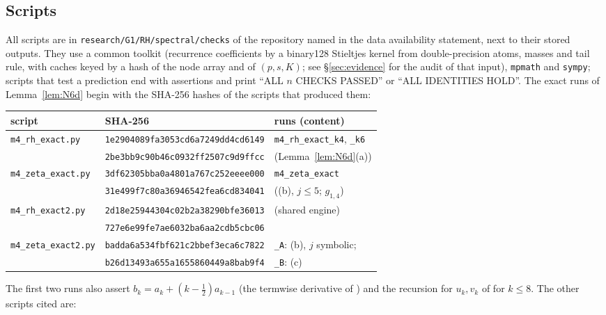 \subsection*{Scripts}
All scripts are in \texttt{research/G1/RH/spectral/checks} of the repository named in the data availability statement, next to their stored
outputs. They use a common toolkit (recurrence coefficients by a binary128 Stieltjes kernel from double-precision atoms, masses and tail
rule, with caches keyed by a hash of the node array and of $(p,s,K)$; see \S\ref{sec:evidence} for the audit of that input), \texttt{mpmath} and \texttt{sympy}; scripts that test a prediction end with assertions and print ``ALL $n$ CHECKS PASSED'' or ``ALL
IDENTITIES HOLD''. The exact runs of Lemma~\ref{lem:N6d} begin with the SHA-256 hashes of the scripts that produced them:
\begin{center}
\small
\begin{tabular}{lll}
\toprule
script & SHA-256 & runs (content)\\
\midrule
\texttt{m4\_rh\_exact.py} & \texttt{1e2904089fa3053cd6a7249dd4cd6149} & \texttt{m4\_rh\_exact\_k4}, \texttt{\_k6}\\
 & \texttt{2be3bb9c90b46c0932ff2507c9d9ffcc} & (Lemma~\ref{lem:N6d}(a))\\
\texttt{m4\_zeta\_exact.py} & \texttt{3df62305bba0a4801a767c252eeee000} & \texttt{m4\_zeta\_exact}\\
 & \texttt{31e499f7c80a36946542fea6cd834041} & ((b), $j\le5$; $g_{1,4}$)\\
\texttt{m4\_rh\_exact2.py} & \texttt{2d18e25944304c02b2a38290bfe36013} & (shared engine)\\
 & \texttt{727e6e99fe7ae6032ba6aa2cdb5cbc06} & \\
\texttt{m4\_zeta\_exact2.py} & \texttt{badda6a534fbf621c2bbef3eca6c7822} & \texttt{\_A}: (b), $j$ symbolic;\\
 & \texttt{b26d13493a655a1655860449a8bab9f4} & \texttt{\_B}: (c)\\
\bottomrule
\end{tabular}
\end{center}
The first two runs also assert $b_k=a_k+(k-\frac12)a_{k-1}$ (the termwise derivative of \cite[(10.40.2)]{DLMF}) and the recursion for $u_k,v_k$ of
\cite[(9.7.2)]{DLMF} for $k\le8$. The other scripts cited are:
